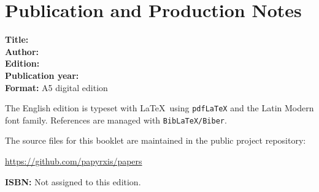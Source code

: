 \chapter*{Publication and Production Notes}

\noindent
\textbf{Title:} \BookletTitle\\
\textbf{Author:} \BookletAuthor\\
\textbf{Edition:} \BookletEdition\\
\textbf{Publication year:} \BookletYear\\
\textbf{Format:} A5 digital edition

\medskip
\noindent
The English edition is typeset with \LaTeX\ using \texttt{pdfLaTeX}
and the Latin Modern font family. References are managed with
\texttt{BibLaTeX/Biber}.

\medskip
\noindent
The source files for this booklet are maintained in the public project
repository:
\begin{center}
\url{https://github.com/papyrxis/papers}
\end{center}

\noindent
\textbf{ISBN:} Not assigned to this edition.

